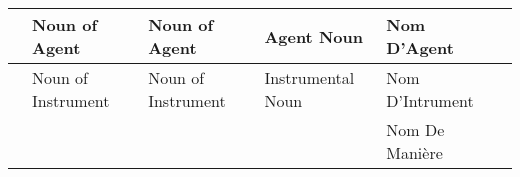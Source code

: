 \begin{tabular}{|l|l|l|l|l|l|}
                         & Noun of Agent      & Noun of Agent        & Agent Noun         & Nom D'Agent                 &         \\ \hline
                         & Noun of Instrument & Noun of Instrument   & Instrumental Noun  & Nom D'Intrument             &         \\ \hline
                         &                    &                      &                    & Nom De Mani\`{e}re          &         \\ \hline
\end{tabular} \\






